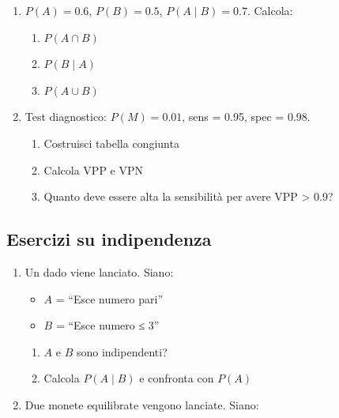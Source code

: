 \documentclass[
  letterpaper,
  DIV=11,
  numbers=noendperiod,
  oneside]{scrreprt}
\providecommand{\tightlist}{%
  \setlength{\itemsep}{0pt}\setlength{\parskip}{0pt}}
\theoremstyle{definition}
\theoremstyle{plain}
\theoremstyle{definition}
\theoremstyle{remark}
\begin{document}
\begin{tcolorbox}
\begin{enumerate}
  Calcola:

  \begin{enumerate}
  \def\labelenumii{\alph{enumii}.}
  \tightlist
  \item
    \(P(A \mid B)\)
  \item
    \(P(B \mid A)\)
  \item
    \(P(A \mid B^c)\)
  \item
    Gli eventi sono indipendenti?
  \end{enumerate}
\item
  \(P(A) = 0.6\), \(P(B) = 0.5\), \(P(A \mid B) = 0.7\). Calcola:

  \begin{enumerate}
  \def\labelenumii{\alph{enumii}.}
  \tightlist
  \item
    \(P(A \cap B)\)
  \item
    \(P(B \mid A)\)
  \item
    \(P(A \cup B)\)
  \end{enumerate}
\item
  Test diagnostico: \(P(M) = 0.01\), sens = 0.95, spec = 0.98.

  \begin{enumerate}
  \def\labelenumii{\alph{enumii}.}
  \tightlist
  \item
    Costruisci tabella congiunta
  \item
    Calcola VPP e VPN
  \item
    Quanto deve essere alta la sensibilità per avere VPP \textgreater{}
    0.9?
  \end{enumerate}
\end{enumerate}

\subsection{Esercizi su indipendenza}\label{esercizi-su-indipendenza}

\begin{enumerate}
\def\labelenumi{\arabic{enumi}.}
\setcounter{enumi}{8}
\tightlist
\item
  Un dado viene lanciato. Siano:

  \begin{itemize}
  \tightlist
  \item
    \(A\) = ``Esce numero pari''
  \item
    \(B\) = ``Esce numero ≤ 3''
  \end{itemize}

  \begin{enumerate}
  \def\labelenumii{\alph{enumii}.}
  \tightlist
  \item
    \(A\) e \(B\) sono indipendenti?
  \item
    Calcola \(P(A \mid B)\) e confronta con \(P(A)\)
  \end{enumerate}
\item
  Due monete equilibrate vengono lanciate. Siano:


\end{enumerate}
\end{tcolorbox}
\end{document}
